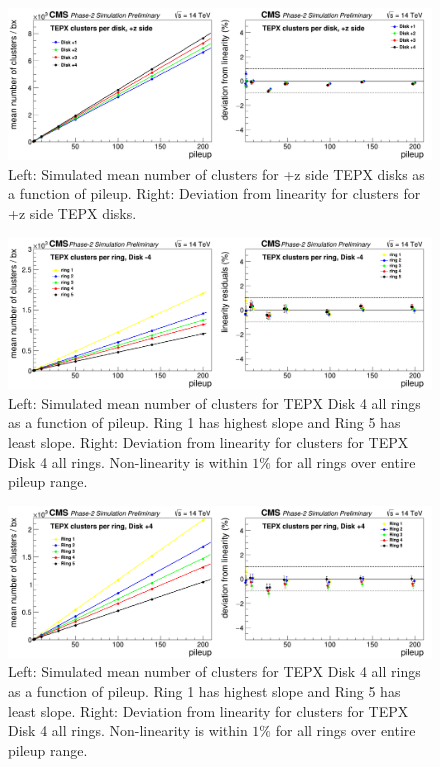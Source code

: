 \begin{figure}[H]
  \centering
  \includegraphics[width=1 \columnwidth]{./clustersperdisk+z.png}
  \caption{Left: Simulated mean number of clusters for +z side TEPX disks as a function of pileup. Right: Deviation from linearity for clusters for +z side TEPX disks.}
  \label{fig:CMS}
\end{figure}


\begin{figure}[H]
  \centering
  \includegraphics[width=1\columnwidth]{./clustersperringD-4.png}
  \caption{Left: Simulated mean number of clusters for TEPX Disk 4 all rings as a function of pileup. Ring 1 has highest slope and Ring 5 has least slope. Right: Deviation from linearity for clusters for TEPX Disk 4 all rings. Non-linearity is within $1\%$ for all rings over entire pileup range.}
  \label{fig:CMS}
\end{figure}

\begin{figure}[H]
  \centering
  \includegraphics[width=1\columnwidth]{./clustersperringD+4.png}
  \caption{Left: Simulated mean number of clusters for TEPX Disk 4 all rings as a function of pileup. Ring 1 has highest slope and Ring 5 has least slope. Right: Deviation from linearity for clusters for TEPX Disk 4 all rings. Non-linearity is within $1\%$ for all rings over entire pileup range.}
  \label{fig:CMS}
\end{figure}




